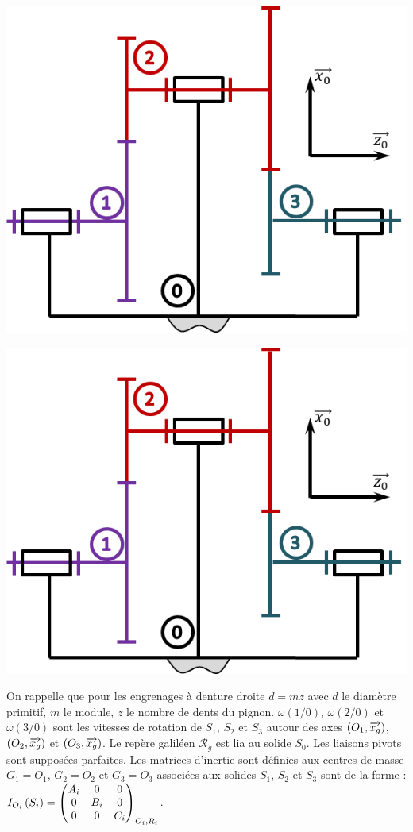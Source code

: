 \documentclass[10pt,fleqn]{article} %
\begin{document}
\begin{multicols}{2}
\ifprof
\begin{center}
\includegraphics[width=.5\linewidth]{images/red_01}
\end{center}
\else
\begin{center}
\includegraphics[width=\linewidth]{images/red_01}
\end{center}
\fi
On rappelle que pour les engrenages à denture droite $d=mz$ avec $d$ le diamètre primitif, $m$ le module, $z$ le nombre de dents du pignon. $\omega(1/0)$, $\omega(2/0)$ et $\omega(3/0)$ sont les vitesses de rotation de $S_1$, $S_2$ et $S_3$ autour des axes $\left(O_1,\vect{x_g}\right)$, $\left(O_2,\vect{x_g}\right)$ et $\left(O_3,\vect{x_g}\right)$. Le repère galiléen $\mathcal{R}_g$ est lia au solide $S_0$. Les liaisons pivots sont supposées parfaites. Les matrices d'inertie sont définies aux centres de masse $G_1=O_1$, $G_2=O_2$ et $G_3=O_3$ associées aux solides $S_1$, $S_2$ et $S_3$ sont de la forme : $\inertie{O_i}{S_i}=\matinertie{A_i}{B_i}{C_i}{0}{0}{0}{O_i,R_i}$.



\end{multicols}
\end{document}
